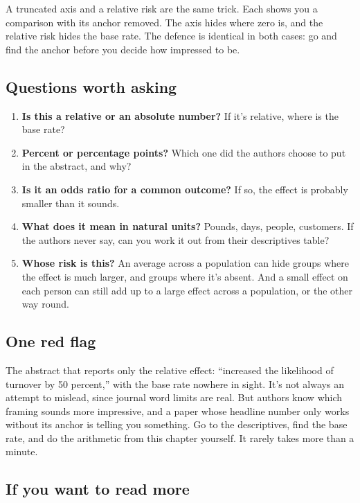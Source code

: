 \documentclass[
]{book}
\providecommand{\tightlist}{%
  \setlength{\itemsep}{0pt}\setlength{\parskip}{0pt}}
\begin{document}
A truncated axis and a relative risk are the same trick. Each shows you a comparison with its anchor removed. The axis hides where zero is, and the relative risk hides the base rate. The defence is identical in both cases: go and find the anchor before you decide how impressed to be.

\subsection{Questions worth asking}\label{questions-worth-asking}

\begin{enumerate}
\def\labelenumi{\arabic{enumi}.}
\tightlist
\item
  \textbf{Is this a relative or an absolute number?} If it's relative, where is the base rate?
\item
  \textbf{Percent or percentage points?} Which one did the authors choose to put in the abstract, and why?
\item
  \textbf{Is it an odds ratio for a common outcome?} If so, the effect is probably smaller than it sounds.
\item
  \textbf{What does it mean in natural units?} Pounds, days, people, customers. If the authors never say, can you work it out from their descriptives table?
\item
  \textbf{Whose risk is this?} An average across a population can hide groups where the effect is much larger, and groups where it's absent. And a small effect on each person can still add up to a large effect across a population, or the other way round.
\end{enumerate}

\subsection{One red flag}\label{one-red-flag}

The abstract that reports only the relative effect: ``increased the likelihood of turnover by 50 percent,'' with the base rate nowhere in sight. It's not always an attempt to mislead, since journal word limits are real. But authors know which framing sounds more impressive, and a paper whose headline number only works without its anchor is telling you something. Go to the descriptives, find the base rate, and do the arithmetic from this chapter yourself. It rarely takes more than a minute.

\subsection{If you want to read more}\label{if-you-want-to-read-more}
\end{document}
